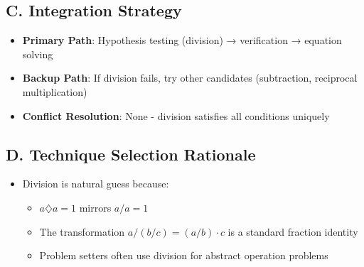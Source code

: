 \documentclass[11pt]{article}
\begin{document}
\begin{conversionbox}
\subsection*{C. Integration Strategy}
\begin{itemize}[leftmargin=*]
    \item \textbf{Primary Path}: Hypothesis testing (division) → verification → equation solving
    \item \textbf{Backup Path}: If division fails, try other candidates (subtraction, reciprocal multiplication)
    \item \textbf{Conflict Resolution}: None - division satisfies all conditions uniquely
\end{itemize}

\subsection*{D. Technique Selection Rationale}
\begin{itemize}[leftmargin=*]
    \item Division is natural guess because:
    \begin{itemize}
        \item $a \diamondsuit a = 1$ mirrors $a/a = 1$
        \item The transformation $a/(b/c) = (a/b) \cdot c$ is a standard fraction identity
        \item Problem setters often use division for abstract operation problems
    \end{itemize}
\end{itemize}
\end{conversionbox}
\end{document}
